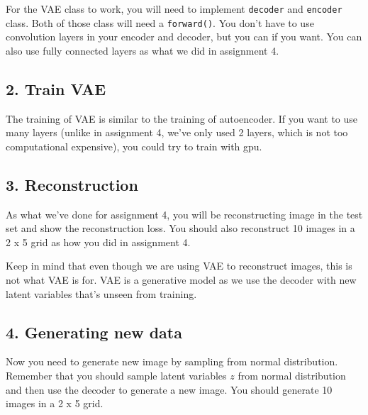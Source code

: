 \documentclass{article}
\begin{document}
For the VAE class to work, you will need to implement \texttt{decoder} and \texttt{encoder} class. Both of those class will need a \texttt{forward()}. You don't have to use convolution layers in your encoder and decoder, but you can if you want. You can also use fully connected layers as what we did in assignment 4.

\subsection*{2. Train VAE}
The training of VAE is similar to the training of autoencoder. If you want to use many layers (unlike in assignment 4, we've only used 2 layers, which is not too computational expensive), you could try to train with gpu.

\subsection*{3. Reconstruction}
As what we've done for assignment 4, you will be reconstructing image in the test set and show the reconstruction loss. You should also reconstruct 10 images in a 2 x 5 grid as how you did in assignment 4.

Keep in mind that even though we are using VAE to reconstruct images, this is not what VAE is for. VAE is a generative model as we use the decoder with new latent variables that's unseen from training.

\subsection*{4. Generating new data}
Now you need to generate new image by sampling from normal distribution. Remember that you should sample  latent variables $z$ from normal distribution and then use the decoder to generate a new image. You should generate 10 images in a 2 x 5 grid.
\end{document}
